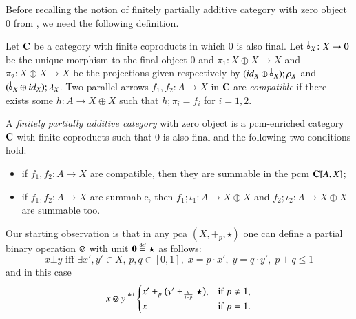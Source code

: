Before recalling the  notion of finitely partially additive category with zero object $0$ from \cite[Definition 3.1.2]{chophd}, we need the following definition.
\begin{definition}
Let  $\mathbf{C}$ be a category with finite coproducts in which $0$ is also final. Let\, $\bangp{X}\colon X \to 0$ be the unique morphism to the final object $0$ and $\pi_1\colon X\oplus X \to X$ and $\pi_2\colon X\oplus X \to X$ be the projections given respectively by $(\id{X}\oplus\, \bangp{X});\runit{X}$ and $(\,\bangp{X}\oplus \id{X});\lunit{X}$.
Two parallel arrows $f_1,f_2 \colon A \to X$ in $\mathbf{C}$ are \emph{compatible} if there exists some $h\colon A\to X \oplus X$ such that $h;\pi_i=f_i$ for $i=1,2$.
\end{definition}
\begin{definition}\label{dfn:finpac}
 A \emph{finitely partially additive category} with zero object is a  pcm-enriched category $\mathbf{C}$ with finite coproducts such that $0$ is also final and the following two conditions hold:
    \begin{itemize}
        \item if $f_1,f_2\colon A \to X$ are compatible, then they are summable in the pcm $\mathbf{C}[A,X]$;
        \item if $f_1,f_2\colon A \to X$ are summable, then $f_1;\iota_1\colon A\to X \oplus X$ and $f_2;\iota_2\colon A \to X \oplus X$ are summable too.%
    \end{itemize}
\end{definition}


Our starting observation is that in any pca $(X,+_p, \star)$ %
one can define a partial binary operation $\circledvee$  with unit $\mathbf{0}\stackrel{\text{\tiny def}}{=} \star$ as follows: 
\begin{equation}\label{eq:defbot}
x\bot y \text{ iff } \exists x',y'\in X, \, p,q\in[0,1] ,\; x=p\cdot x', \; y=q\cdot y', \; p+q\leq 1
\end{equation}
and in this case %
\begin{equation}\label{eq:defcircledvee}
x \circledvee y \defeq
\begin{cases}
x' +_p \bigl(y' +_{\frac{q}{1-p}} \star\bigr), & \text{if } p \neq 1, \\
x & \text{if } p = 1.
\end{cases}
\end{equation}

